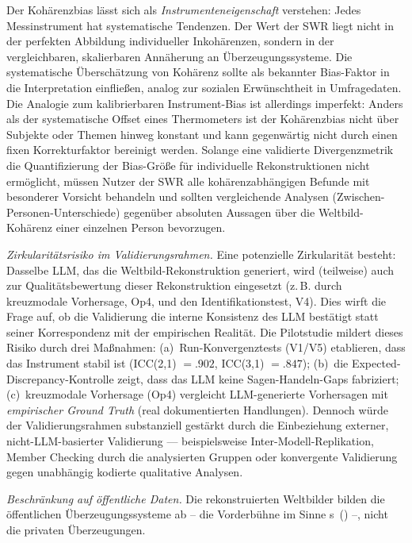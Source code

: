\documentclass[11pt,a4paper]{article}
\theoremstyle{definition}
\theoremstyle{plain}
\theoremstyle{remark}
\begin{document}
Der Koh\"arenzbias l\"asst sich als \emph{Instrumenteneigenschaft} verstehen: Jedes Messinstrument hat systematische Tendenzen. Der Wert der SWR liegt nicht in der perfekten Abbildung individueller Inkoh\"arenzen, sondern in der vergleichbaren, skalierbaren Ann\"aherung an \"Uberzeugungssysteme. Die systematische \"Ubersch\"atzung von Koh\"arenz sollte als bekannter Bias-Faktor in die Interpretation einflie\ss{}en, analog zur sozialen Erw\"unschtheit in Umfragedaten. Die Analogie zum kalibrierbaren Instrument-Bias ist allerdings imperfekt: Anders als der systematische Offset eines Thermometers ist der Koh\"arenzbias nicht \"uber Subjekte oder Themen hinweg konstant und kann gegenw\"artig nicht durch einen fixen Korrekturfaktor bereinigt werden. Solange eine validierte Divergenzmetrik die Quantifizierung der Bias-Gr\"o\ss{}e f\"ur individuelle Rekonstruktionen nicht erm\"oglicht, m\"ussen Nutzer der SWR alle koh\"arenzabh\"angigen Befunde mit besonderer Vorsicht behandeln und sollten vergleichende Analysen (Zwischen-Personen-Unterschiede) gegen\"uber absoluten Aussagen \"uber die Weltbild-Koh\"arenz einer einzelnen Person bevorzugen.

\emph{Zirkularit\"atsrisiko im Validierungsrahmen.} Eine potenzielle Zirkularit\"at besteht: Dasselbe LLM, das die Weltbild-Rekonstruktion generiert, wird (teilweise) auch zur Qualit\"atsbewertung dieser Rekonstruktion eingesetzt (z.\,B. durch kreuzmodale Vorhersage, Op4, und den Identifikationstest, V4). Dies wirft die Frage auf, ob die Validierung die interne Konsistenz des LLM best\"atigt statt seiner Korrespondenz mit der empirischen Realit\"at. Die Pilotstudie mildert dieses Risiko durch drei Ma\ss{}nahmen: (a)~Run-Konvergenztests (V1/V5) etablieren, dass das Instrument stabil ist (ICC(2,1) $= .902$, ICC(3,1) $= .847$); (b)~die Expected-Discrepancy-Kontrolle zeigt, dass das LLM keine Sagen-Handeln-Gaps fabriziert; (c)~kreuzmodale Vorhersage (Op4) vergleicht LLM-generierte Vorhersagen mit \emph{empirischer Ground Truth} (real dokumentierten Handlungen). Dennoch w\"urde der Validierungsrahmen substanziell gest\"arkt durch die Einbeziehung externer, nicht-LLM-basierter Validierung --- beispielsweise Inter-Modell-Replikation, Member Checking durch die analysierten Gruppen oder konvergente Validierung gegen unabh\"angig kodierte qualitative Analysen.

\emph{Beschr\"ankung auf \"offentliche Daten.} Die rekonstruierten Weltbilder bilden die \"offentlichen \"Uberzeugungssysteme ab -- die \glqq Vorderb\"uhne\grqq{} im Sinne \citeauthor{Goffman1959}s~(\citeyear{Goffman1959}) --, nicht die privaten \"Uberzeugungen.
\end{document}
